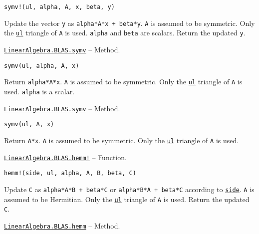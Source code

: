 \begin{adjustwidth}{2em}{0pt}


\begin{verbatim}
symv!(ul, alpha, A, x, beta, y)
\end{verbatim}

Update the vector \texttt{y} as \texttt{alpha*A*x + beta*y}. \texttt{A} is assumed to be symmetric. Only the \hyperlink{13880289478825450693}{\texttt{ul}} triangle of \texttt{A} is used. \texttt{alpha} and \texttt{beta} are scalars. Return the updated \texttt{y}.



\end{adjustwidth}
\hypertarget{14626630492059654377}{}
\hyperlink{14626630492059654377}{\texttt{LinearAlgebra.BLAS.symv}}  -- {Method.}

\begin{adjustwidth}{2em}{0pt}


\begin{verbatim}
symv(ul, alpha, A, x)
\end{verbatim}

Return \texttt{alpha*A*x}. \texttt{A} is assumed to be symmetric. Only the \hyperlink{13880289478825450693}{\texttt{ul}} triangle of \texttt{A} is used. \texttt{alpha} is a scalar.



\end{adjustwidth}
\hypertarget{6081050920217672948}{}
\hyperlink{6081050920217672948}{\texttt{LinearAlgebra.BLAS.symv}}  -- {Method.}

\begin{adjustwidth}{2em}{0pt}


\begin{verbatim}
symv(ul, A, x)
\end{verbatim}

Return \texttt{A*x}. \texttt{A} is assumed to be symmetric. Only the \hyperlink{13880289478825450693}{\texttt{ul}} triangle of \texttt{A} is used.



\end{adjustwidth}
\hypertarget{16247072505934468966}{}
\hyperlink{16247072505934468966}{\texttt{LinearAlgebra.BLAS.hemm!}}  -- {Function.}

\begin{adjustwidth}{2em}{0pt}


\begin{verbatim}
hemm!(side, ul, alpha, A, B, beta, C)
\end{verbatim}

Update \texttt{C} as \texttt{alpha*A*B + beta*C} or \texttt{alpha*B*A + beta*C} according to \hyperlink{3128026147631247774}{\texttt{side}}. \texttt{A} is assumed to be Hermitian. Only the \hyperlink{13880289478825450693}{\texttt{ul}} triangle of \texttt{A} is used. Return the updated \texttt{C}.



\end{adjustwidth}
\hypertarget{14113815705149756496}{}
\hyperlink{14113815705149756496}{\texttt{LinearAlgebra.BLAS.hemm}}  -- {Method.}

